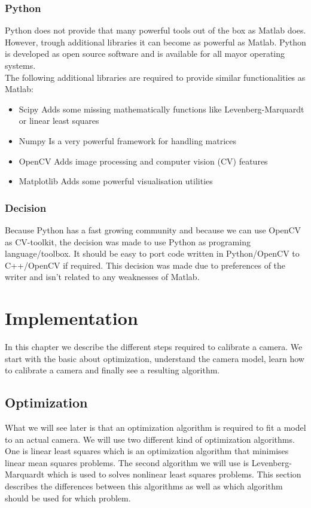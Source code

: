 \documentclass[11pt,a4paper,titlepage,oneside]{report}
\begin{document}
\subsection{Python}
Python does not provide that many powerful tools out of the box as Matlab does. However, trough additional libraries it can become as powerful as Matlab. Python is developed as open source software and is available for all mayor operating systems.\\
The following additional libraries are required to provide similar functionalities as Matlab:
\begin{itemize}
  \item Scipy
    \subitem Adds some missing mathematically functions like Levenberg-Marquardt or linear least squares
  \item Numpy
    \subitem Is a very powerful framework for handling matrices
  \item OpenCV
		\subitem Adds image processing and computer vision (CV) features
  \item Matplotlib
    \subitem Adds some powerful visualisation utilities
\end{itemize}

\subsection{Decision}
Because Python has a fast growing community and because we can use OpenCV as CV-toolkit, the decision was made to use Python as programing language/toolbox. It should be easy to port code written in Python/OpenCV to C++/OpenCV if required. This decision was made due to preferences of the writer and isn't related to any weaknesses of Matlab.

\chapter{Implementation}\label{chap:implementation}

In this chapter we describe the different steps required to calibrate a camera. We start with the basic about optimization, understand the camera model, learn how to calibrate a camera and finally see a resulting algorithm.

\section{Optimization}
What we will see later is that an optimization algorithm is required to fit a model to an actual camera. We will use two different kind of optimization algorithms. One is linear least squares which is an optimization algorithm that minimises linear mean squares problems. The second algorithm we will use is Levenberg-Marquardt which is used to solves nonlinear least squares problems. This section describes the differences between this algorithms as well as which algorithm should be used for which problem.
\end{document}
